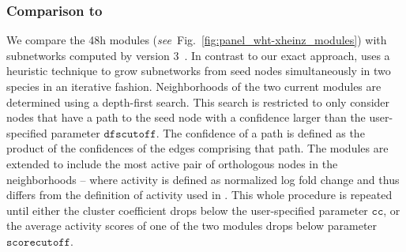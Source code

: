 


\subsubsection{Comparison to \nexus}
\label{sec:Nexus}

We compare the \unit{48}{h} \xheinz{} modules (\emph{see}~Fig.~\ref{fig:panel_wht-xheinz_modules}) with subnetworks computed by \nexus{} version 3~\parencite{deshpande2010scalable}.
In contrast to our exact approach, \nexus{} uses a heuristic technique to grow subnetworks from seed nodes simultaneously in two species in an iterative fashion.
Neighborhoods of the two current modules are determined using a depth-first search.
This search is restricted to only consider nodes that have a path to the seed node with a confidence larger than the user-specified parameter $\mathtt{dfscutoff}$.
The confidence of a path is defined as the product of the confidences of the edges comprising that path.
The modules are extended to include the most active pair of orthologous nodes in the neighborhoods -- where activity is defined as normalized log fold change and thus differs from the definition of activity used in \xheinz{}.
This whole procedure is repeated until either the cluster coefficient drops below the user-specified parameter $\mathtt{cc}$, or the average activity scores of one of the two modules drops below parameter $\mathtt{scorecutoff}$.

